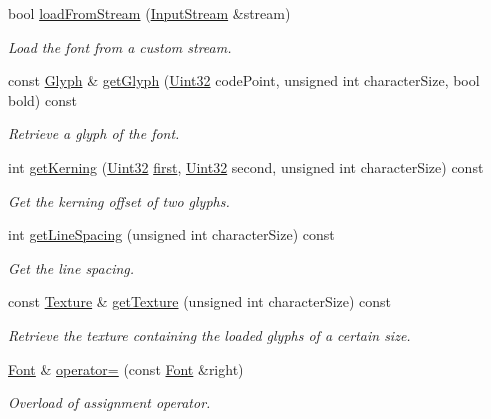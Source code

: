 \begin{DoxyCompactItemize}
bool \hyperlink{classsf_1_1_font_abc3f37a354ce8b9a21f8eb93bd9fdafb}{load\-From\-Stream} (\hyperlink{classsf_1_1_input_stream}{Input\-Stream} \&stream)
\begin{DoxyCompactList}\small\item\em Load the font from a custom stream. \end{DoxyCompactList}\item 
const \hyperlink{classsf_1_1_glyph}{Glyph} \& \hyperlink{classsf_1_1_font_a148eb92890113052f12f8a231ad619b9}{get\-Glyph} (\hyperlink{namespacesf_aa746fb1ddef4410bddf198ebb27e727c}{Uint32} code\-Point, unsigned int character\-Size, bool bold) const 
\begin{DoxyCompactList}\small\item\em Retrieve a glyph of the font. \end{DoxyCompactList}\item 
int \hyperlink{classsf_1_1_font_a4093f7d2d195c88ea90b34cf14e003c8}{get\-Kerning} (\hyperlink{namespacesf_aa746fb1ddef4410bddf198ebb27e727c}{Uint32} \hyperlink{gl3_8h_ada771a798be00a696d20928c9a3371e7}{first}, \hyperlink{namespacesf_aa746fb1ddef4410bddf198ebb27e727c}{Uint32} second, unsigned int character\-Size) const 
\begin{DoxyCompactList}\small\item\em Get the kerning offset of two glyphs. \end{DoxyCompactList}\item 
int \hyperlink{classsf_1_1_font_a05f23b88b13bd094083da5b7efc94371}{get\-Line\-Spacing} (unsigned int character\-Size) const 
\begin{DoxyCompactList}\small\item\em Get the line spacing. \end{DoxyCompactList}\item 
const \hyperlink{classsf_1_1_texture}{Texture} \& \hyperlink{classsf_1_1_font_a887368a4e6a3dfa32dea89d2af315951}{get\-Texture} (unsigned int character\-Size) const 
\begin{DoxyCompactList}\small\item\em Retrieve the texture containing the loaded glyphs of a certain size. \end{DoxyCompactList}\item 
\hyperlink{classsf_1_1_font}{Font} \& \hyperlink{classsf_1_1_font_a232515549846e3172a514d0b47918399}{operator=} (const \hyperlink{classsf_1_1_font}{Font} \&right)
\begin{DoxyCompactList}\small\item\em Overload of assignment operator. \end{DoxyCompactList}\end{DoxyCompactItemize}
